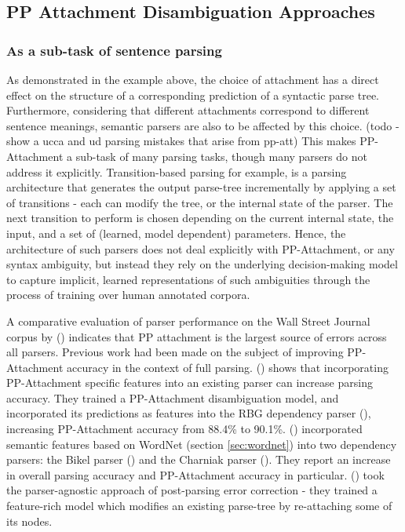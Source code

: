 \subsection{PP Attachment Disambiguation Approaches}

\subsubsection{As a sub-task of sentence parsing}
As demonstrated in the example above, the choice of attachment has a direct effect on the structure of a corresponding prediction of a syntactic parse tree. Furthermore, considering that different attachments correspond to different sentence meanings, semantic parsers are also to be affected by this choice. 
(todo - show a ucca and ud parsing mistakes that arise from pp-att)
This makes PP-Attachment a sub-task of many parsing tasks, though many parsers do not address it explicitly. Transition-based parsing for example, is a parsing architecture that generates the output parse-tree incrementally by applying a set of transitions - each can modify the tree, or the internal state of the parser. The next transition to perform is chosen depending on the current internal state, the input, and a set of (learned, model dependent) parameters. Hence, the architecture of such parsers does not deal explicitly with PP-Attachment, or any syntax ambiguity, but instead they rely on the underlying decision-making model to capture implicit, learned representations of such ambiguities through the process of training over human annotated corpora. 


A comparative evaluation of parser performance on the Wall Street Journal corpus by (\cite{kummerfeld12parser}) indicates that PP attachment is the largest source of errors across all parsers.  Previous work had been made on the subject of improving PP-Attachment accuracy in the context of full parsing. (\cite{hpcd}) shows that incorporating PP-Attachment specific features into an existing parser can increase parsing accuracy. They trained a PP-Attachment disambiguation model, and incorporated its predictions as features into the RBG dependency parser (\cite{lei-etal-14-low}), increasing PP-Attachment accuracy from 88.4\% to 90.1\%.  (\cite{agirre-etal-08-improving}) incorporated semantic features based on WordNet (section \ref{sec:wordnet}) into two dependency parsers: the Bikel parser (\cite{bikel}) and the Charniak parser (\cite{charniak}). They report an increase in overall parsing accuracy and PP-Attachment accuracy in particular. (\cite{henestrozaanguiano:hal-00602083}) took the parser-agnostic approach of post-parsing error correction - they trained a feature-rich model which modifies an existing parse-tree by re-attaching some of its nodes. 

